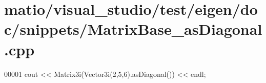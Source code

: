 \hypertarget{matio_2visual__studio_2test_2eigen_2doc_2snippets_2_matrix_base__as_diagonal_8cpp_source}{}\section{matio/visual\+\_\+studio/test/eigen/doc/snippets/\+Matrix\+Base\+\_\+as\+Diagonal.cpp}
\label{matio_2visual__studio_2test_2eigen_2doc_2snippets_2_matrix_base__as_diagonal_8cpp_source}

\begin{DoxyCode}
00001 cout << Matrix3i(Vector3i(2,5,6).asDiagonal()) << endl;
\end{DoxyCode}
